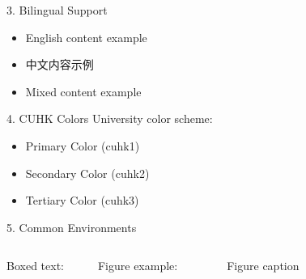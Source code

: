 \documentclass[10pt]{beamer}
\begin{document}
\begin{frame}{3. Bilingual Support}
    \begin{itemize}
        \item English content example
        \item 中文内容示例
        \item Mixed content example
    \end{itemize}
    
    \begin{center}
        \large
    \end{center}
\end{frame}


\begin{frame}{4. CUHK Colors}
    University color scheme:
    \begin{itemize}
        \item \textcolor{cuhk1}{Primary Color (cuhk1)}
        \item \textcolor{cuhk2}{Secondary Color (cuhk2)}
        \item \textcolor{cuhk3}{Tertiary Color (cuhk3)}
    \end{itemize}
    
    \begin{center}
        \boxed{\textcolor{cuhk1}{Colored Boxed Text}}
    \end{center}
\end{frame}


\begin{frame}{5. Common Environments}
    \begin{columns}
        Boxed text:
        \begin{center}
        \end{center}
        
        Figure example:
        \begin{figure}
            \centering
            \caption{Figure caption}
        \end{figure}
    \end{columns}
\end{frame}
\end{document}
